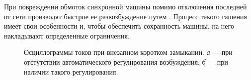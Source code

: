 При повреждении обмоток синхронной машины помимо отключения последней от сети производят быстрое ее развозбуждение путем . Процесс такого гашения имеет свои особенности и, чтобы обеспечить сохранность машины, на него накладывают определенные ограничения.

\begin{figure}
	\begin{minipage}[h]{1\linewidth}
	\end{minipage}
	\vfill
	\begin{minipage}[h]{1\linewidth}
	\end{minipage}
	\caption{Осциллограммы токов при внезапном коротком замыкании. \textit{а} --- при отстутствии автоматического регулирования возбуждения; \textit{б} --- при наличии такого регулирования.}
	\label{ris:1-2 toki_kz_bez_arv_i_s_nim}
\end{figure}

